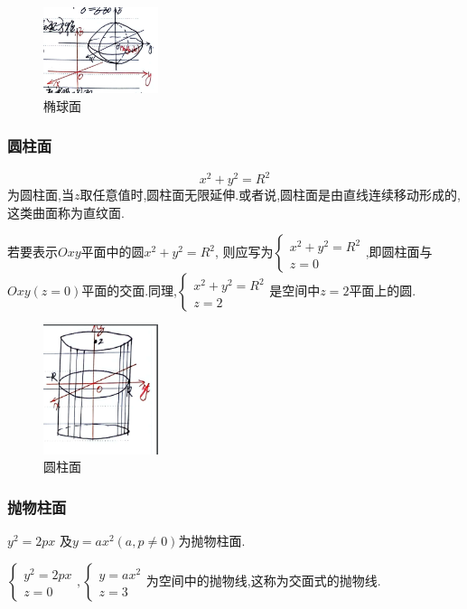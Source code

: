 \begin{figure}[htbp]
    \centering
    \includegraphics[width=0.3\textwidth]{figure/4-1.png}
    \caption{椭球面}
    \label{fig:椭球面}
\end{figure}

\subsubsection*{圆柱面}

$$
x^2 + y^2 = R^2
$$
为圆柱面,当$z$取任意值时,圆柱面无限延伸.或者说,圆柱面是由直线连续移动形成的,这类曲面称为直纹面.

若要表示$Oxy$平面中的圆$x^2 + y^2 = R^2$,
则应写为$\begin{cases}
    x^2 + y^2 = R^2\\
    z = 0
\end{cases}$,即圆柱面与$Oxy(z=0)$平面的交面.同理,$\begin{cases}
    x^2 + y^2 = R^2\\
    z = 2
\end{cases}$是空间中$z=2$平面上的圆.

\begin{figure}[htbp]
    \centering
    \includegraphics[width=0.3\textwidth]{figure/4-2.png}
    \caption{圆柱面}
    \label{fig:圆柱面}
\end{figure}

\subsubsection*{抛物柱面}

$
y^2 = 2px
$
及$y = a x^2( a , p \neq 0)$为抛物柱面.

$\begin{cases}
    y^2 = 2px\\
    z = 0
\end{cases},\begin{cases}
    y = ax^2\\
    z = 3
\end{cases}$为空间中的抛物线,这称为交面式的抛物线.

